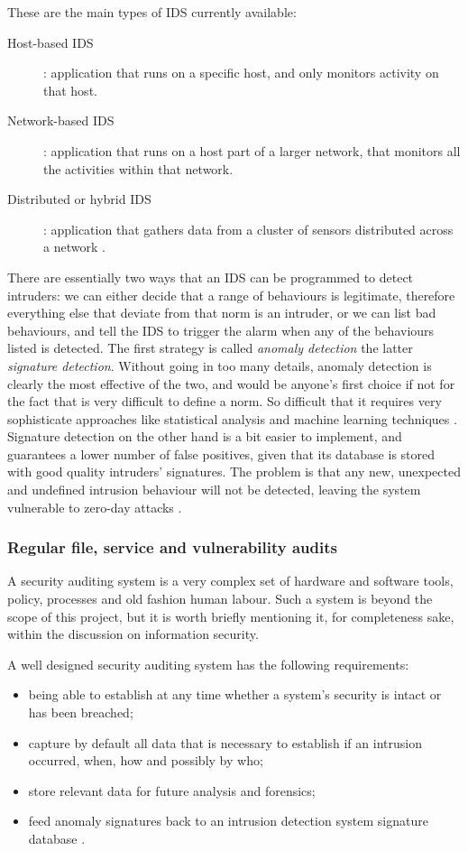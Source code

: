 These are the main types of IDS currently available:
\begin{description}
  \item[Host-based IDS]: application that runs on a specific host, and only
  monitors activity on that host.
  \item[Network-based IDS]: application that runs on a host part of a larger
  network, that monitors all the activities within that network.
  \item[Distributed or hybrid IDS]: application that gathers data from a
  cluster of sensors distributed across a network \cite{RS00}.
\end{description}

There are essentially two ways that an IDS can be programmed to detect
intruders: we can either decide that a range of behaviours is legitimate,
therefore everything else that deviate from that norm is an intruder, or we can
list bad behaviours, and tell the IDS to trigger the alarm when any of the
behaviours listed is detected. The first strategy is called \emph{anomaly
detection} the latter \emph{signature detection}. Without going in too many
details, anomaly detection is clearly the most effective of the two, and would
be anyone's first choice if not for the fact that is very difficult to define a
norm. So difficult that it requires very sophisticate approaches like
statistical analysis and machine learning techniques \cite{GT09}. Signature
detection on the other hand is a bit easier to implement, and guarantees a lower
number of false positives, given that its database is stored with good quality
intruders' signatures. The problem is that any new, unexpected and undefined
intrusion behaviour will not be detected, leaving the system vulnerable to
zero-day attacks \cite{WS15}.

\subsubsection{Regular file, service and vulnerability audits}
A security auditing system is a very complex set of hardware and software tools,
policy, processes and old fashion human labour. Such a system is beyond the scope of
this project, but it is worth briefly mentioning it, for completeness sake,
within the discussion on information security.

A well designed security auditing system has the following requirements:
\begin{itemize}
  \item being able to establish at any time whether a system's security is
  intact or has been breached;
  \item capture by default all data that is necessary to establish if an
  intrusion occurred, when, how and possibly by who;
  \item store relevant data for future analysis and forensics;
  \item feed anomaly signatures back to an intrusion detection system signature
  database \cite{WS15}.
\end{itemize}

